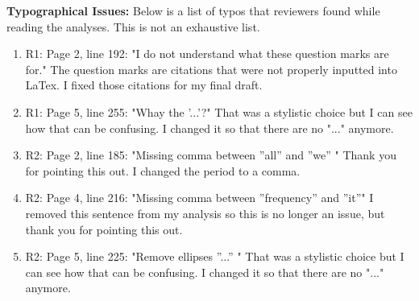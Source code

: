 \documentclass{article}
\begin{document}
\textbf{Typographical Issues:} Below is a list of typos that reviewers found while reading the analyses. This is not an exhaustive list.
\begin{enumerate}
  \item R1: Page 2, line 192: "I do not understand what these question marks are for." 
  The question marks are citations that were not properly inputted into LaTex. I fixed those citations for my final draft. 
  \item R1: Page 5, line 255: "Whay the '...'?"
  That was a stylistic choice but I can see how that can be confusing. I changed it so that there are no "..." anymore. 
  \item R2: Page 2, line 185: "Missing comma between ”all” and ”we” " Thank you for pointing this out. I changed the period to a comma. 
  \item R2: Page 4, line 216: "Missing comma between ”frequency” and ”it”"  I removed this sentence from my analysis so this is no longer an issue, but thank you for pointing this out.
  \item R2: Page 5, line 225: "Remove ellipses ”...” " That was a stylistic choice but I can see how that can be confusing. I changed it so that there are no "..." anymore. 
\end{enumerate}
\end{document}
